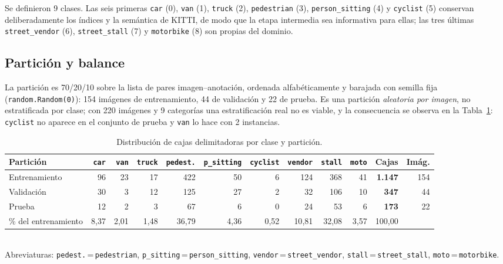 \documentclass[10pt,a4paper]{article}
\begin{document}
Se definieron 9 clases. Las seis primeras \texttt{car} (0), \texttt{van} (1),
\texttt{truck} (2), \texttt{pedestrian} (3), \texttt{person\_sitting} (4) y
\texttt{cyclist} (5) conservan deliberadamente los índices y la semántica de KITTI,
de modo que la etapa intermedia sea informativa para ellas; las tres últimas
\texttt{street\_vendor} (6), \texttt{street\_stall} (7) y \texttt{motorbike} (8)
son propias del dominio.

\subsection{Partición y balance}
La partición es 70/20/10 sobre la lista de pares imagen--anotación, ordenada
alfabéticamente y barajada con semilla fija (\texttt{random.Random(0)}): 154 imágenes de
entrenamiento, 44 de validación y 22 de prueba. Es una partición \emph{aleatoria por
imagen}, no estratificada por clase; con 220 imágenes y 9 categorías una estratificación
real no es viable, y la consecuencia se observa en la Tabla~\ref{tab:balance}:
\texttt{cyclist} no aparece en el conjunto de prueba y \texttt{van} lo hace con 2
instancias.

\begin{table}[H]
\centering\footnotesize
\caption{Distribución de cajas delimitadoras por clase y partición.}
\label{tab:balance}
\begin{tabular}{@{}lrrrrrrrrrrr@{}}
\toprule
\textbf{Partición} & \texttt{car} & \texttt{van} & \texttt{truck} & \texttt{pedest.} &
\texttt{p\_sitting} & \texttt{cyclist} & \texttt{vendor} & \texttt{stall} & \texttt{moto} &
\textbf{Cajas} & \textbf{Imág.}\\
\midrule
Entrenamiento & 96 & 23 & 17 & 422 & 50 & 6 & 124 & 368 & 41 & \textbf{1.147} & 154\\
Validación    & 30 &  3 & 12 & 125 & 27 & 2 &  32 & 106 & 10 & \textbf{347}   &  44\\
Prueba        & 12 &  2 &  3 &  67 &  6 & 0 &  24 &  53 &  6 & \textbf{173}   &  22\\
\midrule
\% del entrenamiento & 8{,}37 & 2{,}01 & 1{,}48 & 36{,}79 & 4{,}36 & 0{,}52 & 10{,}81 &
32{,}08 & 3{,}57 & 100{,}00 & \\
\bottomrule
\end{tabular}\\[2pt]
{\scriptsize Abreviaturas: \texttt{pedest.}\,=\,\texttt{pedestrian},
\texttt{p\_sitting}\,=\,\texttt{person\_sitting}, \texttt{vendor}\,=\,\texttt{street\_vendor},
\texttt{stall}\,=\,\texttt{street\_stall}, \texttt{moto}\,=\,\texttt{motorbike}.}
\end{table}
\end{document}
